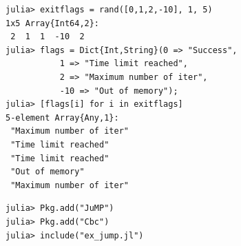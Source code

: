 \begin{frame}[fragile]
\begin{lstlisting}
julia> exitflags = rand([0,1,2,-10], 1, 5)
1x5 Array{Int64,2}:
 2  1  1  -10  2
julia> flags = Dict{Int,String}(0 => "Success",
           1 => "Time limit reached",
           2 => "Maximum number of iter",
           -10 => "Out of memory");
julia> [flags[i] for i in exitflags]
5-element Array{Any,1}:
 "Maximum number of iter"
 "Time limit reached"
 "Time limit reached"
 "Out of memory"
 "Maximum number of iter"
\end{lstlisting}
\end{frame}


\begin{frame}[fragile,c]

\end{frame}

\begin{frame}[fragile,c]
\begin{lstlisting}
julia> Pkg.add("JuMP")
julia> Pkg.add("Cbc")
julia> include("ex_jump.jl")
\end{lstlisting}

\end{frame}

